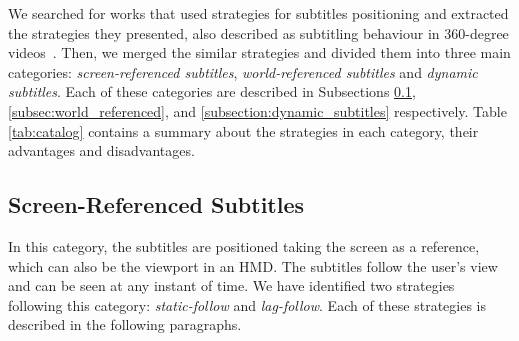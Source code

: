 We searched for works that used strategies for subtitles positioning and extracted the strategies they presented, also described as subtitling behaviour in 360-degree videos~\cite{brown_subtitles_2017}. Then, we merged the similar strategies and divided them into three main categories: \emph{screen-referenced subtitles}, \emph{world-referenced subtitles} and \emph{dynamic subtitles}. Each of these categories are described in Subsections \ref{subsec:screen_referenced}, \ref{subsec:world_referenced}, and \ref{subsection:dynamic_subtitles} respectively. Table \ref{tab:catalog} contains a summary about the strategies in each category, their advantages and disadvantages.

\subsection{Screen-Referenced Subtitles}
\label{subsec:screen_referenced}

In this category, the subtitles are positioned taking the screen as a reference, which can also be the viewport in an HMD. The subtitles follow the user's view and can be seen at any instant of time. We have identified two strategies following this category: \emph{static-follow} and \emph{lag-follow}. Each of these strategies is described in the following paragraphs.

